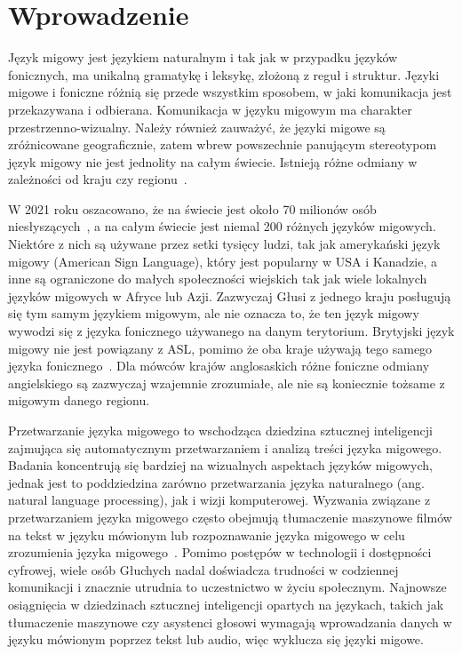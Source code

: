 \hypersetup{pageanchor=true}

\chapter{Wprowadzenie}\label{ch:introduction}

Język migowy jest językiem naturalnym i tak jak w przypadku języków fonicznych, ma unikalną gramatykę i leksykę, złożoną z reguł i struktur. Języki migowe i foniczne różnią się przede wszystkim sposobem, w jaki komunikacja jest przekazywana i odbierana. Komunikacja w języku migowym ma charakter przestrzenno-wizualny. Należy również zauważyć, że języki migowe są zróżnicowane geograficznie, zatem wbrew powszechnie panującym stereotypom język migowy nie jest jednolity na całym świecie. Istnieją różne odmiany w zależności od kraju czy regionu~\cite{stokoe1980}.

W 2021 roku oszacowano, że na świecie jest około 70 milionów osób niesłyszących~\cite{who2021}, a na całym świecie jest niemal 200 różnych języków migowych. Niektóre z nich są używane przez setki tysięcy ludzi, tak jak amerykański język migowy (American Sign Language), który jest popularny w USA i Kanadzie, a inne są ograniczone do małych społeczności wiejskich tak jak wiele lokalnych języków migowych w Afryce lub Azji. Zazwyczaj Głusi z jednego kraju posługują się tym samym językiem migowym, ale nie oznacza to, że ten język migowy wywodzi się z języka fonicznego używanego na danym terytorium. Brytyjski język migowy nie jest powiązany z ASL, pomimo że oba kraje używają tego samego języka fonicznego~\cite{rutkowski2016}. Dla mówców krajów anglosaskich różne foniczne odmiany angielskiego są zazwyczaj wzajemnie zrozumiałe, ale nie są koniecznie tożsame z migowym danego regionu.

Przetwarzanie języka migowego to wschodząca dziedzina sztucznej inteligencji zajmująca się automatycznym przetwarzaniem i analizą treści języka migowego. Badania koncentrują się bardziej na wizualnych aspektach języków migowych, jednak jest to poddziedzina zarówno przetwarzania języka naturalnego (ang. natural language processing), jak i wizji komputerowej. Wyzwania związane z przetwarzaniem języka migowego często obejmują tłumaczenie maszynowe filmów na tekst w języku mówionym lub rozpoznawanie języka migowego w celu zrozumienia języka migowego~\cite{bragg2019}. Pomimo postępów w technologii i dostępności cyfrowej, wiele osób Głuchych nadal doświadcza trudności w codziennej komunikacji i znacznie utrudnia to uczestnictwo w życiu społecznym. Najnowsze osiągnięcia w dziedzinach sztucznej inteligencji opartych na językach, takich jak tłumaczenie maszynowe czy asystenci głosowi wymagają wprowadzania danych w języku mówionym poprzez tekst lub audio, więc wyklucza się języki migowe.




